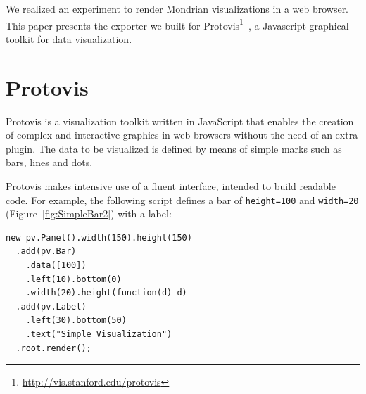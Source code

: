 \documentclass[preprint,10pt]{sigplanconf}
\newcommand{\ct}{\lstinline[backgroundcolor=\color{white},basicstyle=\footnotesize\ttfamily]}
\newcommand{\seclabel}[1]{\label{sec:#1}}
\newcommand{\secref}[1]{Section~\ref{sec:#1}\xspace}
\newcommand{\figref}[1]{Figure~\ref{fig:#1}\xspace}
\begin{document}
We realized an experiment to render Mondrian visualizations in a web browser. This paper presents the exporter we built for Protovis\footnote{\url{http://vis.stanford.edu/protovis}}~\cite{Bost09a}, a Javascript graphical toolkit for data visualization.









%

\section{Protovis} \seclabel{protovis}
Protovis is a visualization toolkit written in JavaScript that enables the creation of complex and interactive graphics in web-browsers without the need of an extra plugin. The data to be visualized is defined by means of simple marks such as bars, lines and dots. 

Protovis makes intensive use of a fluent interface, intended to build readable code. For example, the following script defines a bar of \ct{height=100} and \ct{width=20} (\figref{SimpleBar2}) with a label:

\begin{lstlisting} 
new pv.Panel().width(150).height(150)
  .add(pv.Bar)
    .data([100])
    .left(10).bottom(0)
    .width(20).height(function(d) d)
  .add(pv.Label)
    .left(30).bottom(50)
    .text("Simple Visualization")
  .root.render();
\end{lstlisting}
\end{document}
